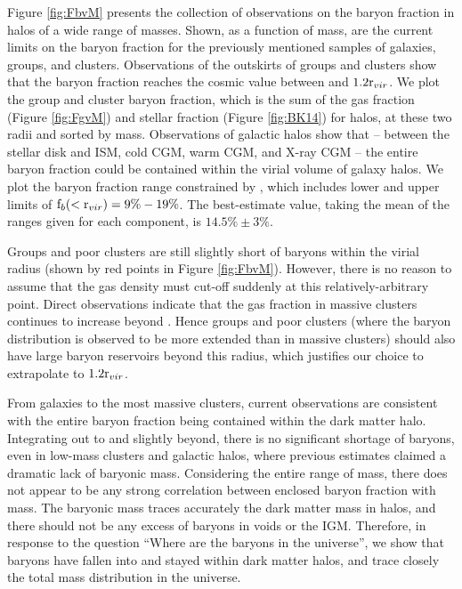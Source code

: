 Figure \ref{fig:FbvM} presents the collection of observations on the
baryon fraction in halos of a wide range of masses. Shown, as a
function of mass, are the current limits on the baryon fraction for
the previously mentioned samples of galaxies, groups, and
clusters. Observations of the outskirts of groups and clusters show
that the baryon fraction reaches the cosmic value between \rvir{} and
$1.2\textrm{r\ensuremath{_{vir}}}{}$. We plot the group and cluster baryon fraction, which is
the sum of the gas fraction (Figure \ref{fig:FgvM}) and stellar
fraction (Figure \ref{fig:BK14}) for halos, at these two radii and
sorted by mass. Observations of galactic halos show that -- between the
stellar disk and ISM, cold CGM, warm CGM, and X-ray CGM -- the entire
baryon fraction could be contained within the virial volume of galaxy
halos. We plot the baryon fraction range constrained by
\citet{Werk2014}, which includes lower and upper limits of
$\textrm{f\ensuremath{_b}}(<\textrm{r\ensuremath{_{vir}}}) = 9\% - 19\%$. The best-estimate value, taking the mean
of the ranges given for each component, is $14.5\% \pm 3\%$.



Groups and poor clusters are still slightly short of baryons within
the virial radius (shown by red points in Figure
\ref{fig:FbvM}). However, there is no reason to assume that the gas
density must cut-off suddenly at this relatively-arbitrary
point. Direct observations \citep{PlanckIntV} indicate that the gas
fraction in massive clusters continues to increase beyond
\rvir{}. Hence groups and poor clusters (where the baryon distribution
is observed to be more extended than in massive clusters) should
also have large baryon reservoirs beyond this radius, which justifies
our choice to extrapolate \fg{} to $1.2\textrm{r\ensuremath{_{vir}}}$.

From galaxies to the most massive clusters, current observations are
consistent with the entire baryon fraction being contained within the
dark matter halo. Integrating out to \rvir{} and slightly beyond,
there is no significant shortage of baryons, even in low-mass clusters
and galactic halos, where previous estimates claimed a dramatic lack
of baryonic mass. Considering the entire range of mass, there does not
appear to be any strong correlation between enclosed baryon fraction
with mass. The baryonic mass traces accurately the dark matter mass in
halos, and there should not be any excess of baryons in voids or the
IGM. Therefore, in response to the question ``Where are the baryons in
the universe'', we show that baryons have fallen into and stayed
within dark matter halos, and trace closely the total mass
distribution in the universe.


